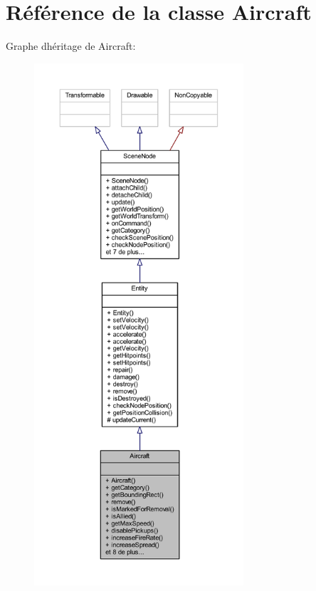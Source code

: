 \hypertarget{class_aircraft}{}\section{Référence de la classe Aircraft}
\label{class_aircraft}


Graphe d\textquotesingle{}héritage de Aircraft\+:\nopagebreak
\begin{figure}[H]
\begin{center}
\leavevmode
\includegraphics[height=550pt]{class_aircraft__inherit__graph}
\end{center}
\end{figure}


